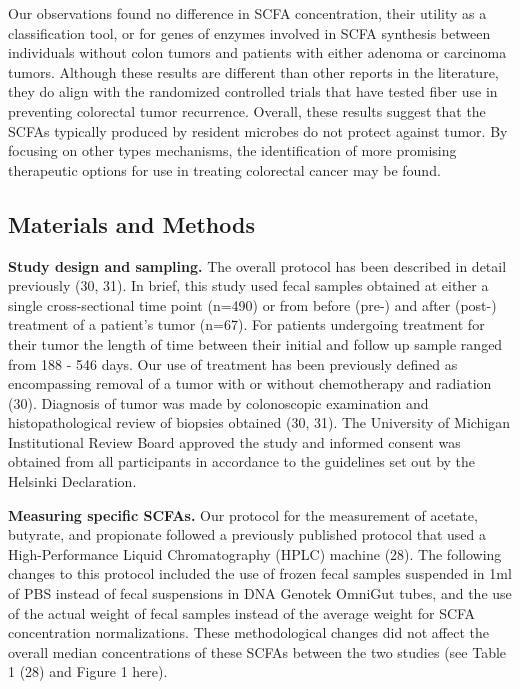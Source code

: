 \documentclass[11pt,]{article}
\begin{document}
Our observations found no difference in SCFA concentration, their
utility as a classification tool, or for genes of enzymes involved in
SCFA synthesis between individuals without colon tumors and patients
with either adenoma or carcinoma tumors. Although these results are
different than other reports in the literature, they do align with the
randomized controlled trials that have tested fiber use in preventing
colorectal tumor recurrence. Overall, these results suggest that the
SCFAs typically produced by resident microbes do not protect against
tumor. By focusing on other types mechanisms, the identification of more
promising therapeutic options for use in treating colorectal cancer may
be found.

\newpage

\subsection{Materials and Methods}\label{materials-and-methods}

\textbf{Study design and sampling.} The overall protocol has been
described in detail previously (30, 31). In brief, this study used fecal
samples obtained at either a single cross-sectional time point (n=490)
or from before (pre-) and after (post-) treatment of a patient's tumor
(n=67). For patients undergoing treatment for their tumor the length of
time between their initial and follow up sample ranged from 188 - 546
days. Our use of treatment has been previously defined as encompassing
removal of a tumor with or without chemotherapy and radiation (30).
Diagnosis of tumor was made by colonoscopic examination and
histopathological review of biopsies obtained (30, 31). The University
of Michigan Institutional Review Board approved the study and informed
consent was obtained from all participants in accordance to the
guidelines set out by the Helsinki Declaration.

\textbf{Measuring specific SCFAs.} Our protocol for the measurement of
acetate, butyrate, and propionate followed a previously published
protocol that used a High-Performance Liquid Chromatography (HPLC)
machine (28). The following changes to this protocol included the use of
frozen fecal samples suspended in 1ml of PBS instead of fecal
suspensions in DNA Genotek OmniGut tubes, and the use of the actual
weight of fecal samples instead of the average weight for SCFA
concentration normalizations. These methodological changes did not
affect the overall median concentrations of these SCFAs between the two
studies (see Table 1 (28) and Figure 1 here).
\end{document}
